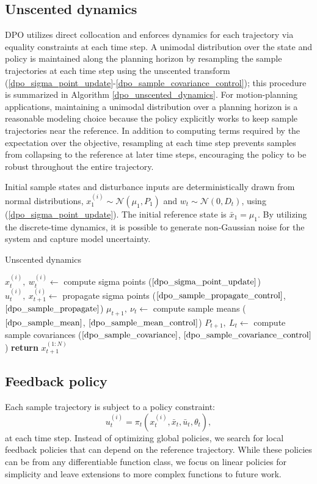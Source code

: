 \subsection{Unscented dynamics}
DPO utilizes direct collocation and enforces dynamics for each trajectory via equality constraints at each time step. A unimodal distribution over the state and policy is maintained along the planning horizon by resampling the sample trajectories at each time step using the unscented transform (\ref{dpo_sigma_point_update}-\ref{dpo_sample_covariance_control}); this procedure is summarized in Algorithm \ref{dpo_unscented_dynamics}. For motion-planning applications, maintaining a unimodal distribution over a planning horizon is a reasonable modeling choice because the policy explicitly works to keep sample trajectories near the reference. In addition to computing terms required by the expectation over the objective, resampling at each time step prevents samples from collapsing to the reference at later time steps, encouraging the policy to be robust throughout the entire trajectory.

Initial sample states and disturbance inputs are deterministically drawn from normal distributions, $x_1^{(i)} \sim \mathcal{N}(\mu_1, P_1)$ and $w_t \sim \mathcal{N}(0, D_t)$, using (\ref{dpo_sigma_point_update}). The initial reference state is $\bar{x}_1 = \mu_1$. By utilizing the discrete-time dynamics, it is possible to generate non-Gaussian noise for the system and capture model uncertainty.

\begin{algorithm}[H]
	\caption[Unscented dynamics]{Unscented dynamics}\label{dpo_unscented_dynamics}
	\begin{algorithmic}[1]
		\State $x_{t}^{(i)},~w_t^{(i)} \leftarrow$ compute sigma points ($\ref{dpo_sigma_point_update}$)
		\State $u^{(i)}_t,~x^{(i)}_{t+1} \leftarrow$ propagate sigma points ($\ref{dpo_sample_propagate_control}$, $\ref{dpo_sample_propagate}$)
		\EndFor
		\State $\mu_{t+1},~\nu_t \leftarrow$ compute sample means ($\ref{dpo_sample_mean}$, $\ref{dpo_sample_mean_control}$)
		\State $P_{t+1},~L_t \leftarrow$ compute sample covariances ($\ref{dpo_sample_covariance}$, $\ref{dpo_sample_covariance_control}$)
		\State \textbf{return} $x_{t+1}^{(1:N)}$
		\EndFunction
	\end{algorithmic}
\end{algorithm}	

\subsection{Feedback policy}
Each sample trajectory is subject to a policy constraint:
\begin{equation}
	u_t^{(i)} = \pi_t(x_t^{(i)},\bar{x}_t,\bar{u}_t,\theta_t), \label{dpo_policy_constraint}
\end{equation}
at each time step. Instead of optimizing global policies, we search for local feedback policies that can depend on the reference trajectory. While these policies can be from any differentiable function class, we focus on linear policies for simplicity and leave extensions to more complex functions to future work.


